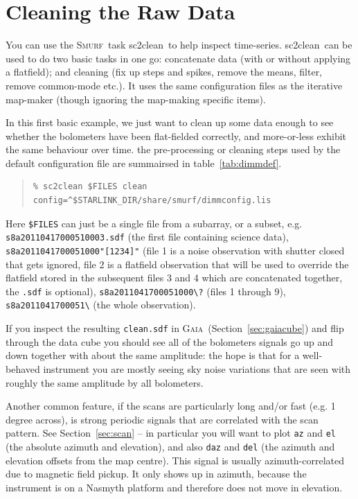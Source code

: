 \documentclass[twoside,11pt]{article}
\newcommand{\xref}[3]{#1}
\newcommand{\xlabel}[1]{}
\renewcommand{\_}{\texttt{\symbol{95}}}
\newenvironment{myquote}{\begin{quote}\begin{small}}{\end{small}\end{quote}}
\newcommand{\gaia}{\xref{\textsc{Gaia}}{sun214}{}}
\newcommand{\smurf}{\xref{\textsc{Smurf}}{sun258}{}}
\newcommand{\task}[1]{\textsf{#1}}
\newcommand{\clean}{\xref{\task{sc2clean}}{sun258}{SC2CLEAN}}
\begin{document}
\newpage
\appendix

\section{\xlabel{app_clean}Cleaning the Raw Data}
\label{app:clean}

You can use the \smurf\ task \clean\ to help inspect time-series.
\clean\ can be used to do two basic tasks in one go: concatenate data
(with or without applying a flatfield); and cleaning (fix up steps and
spikes, remove the means, filter, remove common-mode etc.). It uses
the same configuration files as the iterative map-maker (though
ignoring the map-making specific items).

In this first basic example, we just want to clean up some data enough
to see whether the bolometers have been flat-fielded correctly, and
more-or-less exhibit the same behaviour over time. the pre-processing
or cleaning steps used by the default configuration file are
summairsed in table~\ref{tab:dimmdef}.

\begin{myquote}
\begin{verbatim}
% sc2clean $FILES clean config=^$STARLINK_DIR/share/smurf/dimmconfig.lis
\end{verbatim}
\end{myquote}

Here \texttt{\$FILES} can just be a single file from a subarray, or a
subset, e.g. \texttt{s8a20110417\_00051\_0003.sdf} (the first file
containing science data), \texttt{s8a20110417\_00051\_000"[1234]"}
(file 1 is a noise observation with shutter closed that gets ignored,
file 2 is a flatfield observation that will be used to override the
flatfield stored in the subsequent files 3 and 4 which are
concatenated together, the \texttt{.sdf} is optional),
\texttt{s8a20110417\_00051\_000\textbackslash?} (files 1 through 9),
\texttt{s8a20110417\_00051\_\textbackslash*} (the whole observation).

If you inspect the resulting \texttt{clean.sdf} in \gaia\
(Section~\ref{sec:gaiacube}) and flip through the data cube you should
see all of the bolometers signals go up and down together with about
the same amplitude: the hope is that for a well-behaved instrument you
are mostly seeing sky noise variations that are seen with roughly the
same amplitude by all bolometers.

Another common feature, if the scans are particularly long and/or fast
(e.g. 1\,degree across), is strong periodic signals that are correlated
with the scan pattern. See Section~\ref{sec:scan} -- in particular
you will want to plot \texttt{az} and \texttt{el} (the absolute
azimuth and elevation), and also \texttt{daz} and \texttt{del} (the
azimuth and elevation offsets from the map centre). This signal is
usually azimuth-correlated due to magnetic field pickup. It only shows
up in azimuth, because the instrument is on a Nasmyth platform and
therefore does not move in elevation.
\end{document}
